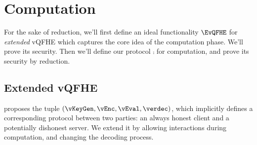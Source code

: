 \section{Computation}


For the sake of reduction, we'll first define an ideal functionality $\EvQFHE$ for \emph{extended} vQFHE which captures the core idea of the computation phase.
We'll prove its security. Then we'll define our protocol $\comp$ for computation, and prove its security by reduction.

\subsection{Extended vQFHE}

\cite{magic_circuits} proposes the tuple $(\vKeyGen, \vEnc, \vEval, \verdec)$,
which implicitly defines a corresponding protocol between two parties: an always honest client and a potentially dishonest server.
We extend it by allowing interactions during computation, and changing the decoding process.

